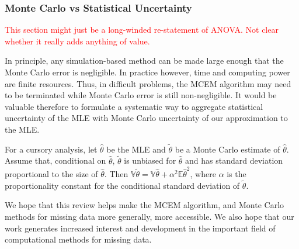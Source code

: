 \documentclass[11pt, oneside]{article}   	%
\newcommand{\bV}{\mathbb{V}}
\newcommand{\bE}{\mathbb{E}}
\begin{document}
\subsubsection{Monte Carlo vs Statistical Uncertainty}
\textcolor{red}{This section might just be a long-winded re-statement of ANOVA. Not clear whether it really adds anything of value.}

In principle, any simulation-based method can be made large enough that the Monte Carlo error is negligible. In practice however, time and computing power are finite resources. Thus, in difficult problems, the MCEM algorithm may need to be terminated while Monte Carlo error is still non-negligible. It would be valuable therefore to formulate a systematic way to aggregate statistical uncertainty of the MLE with Monte Carlo uncertainty of our approximation to the MLE. 

For a cursory analysis, let $\hat{\theta}$ be the MLE and $\tilde{\theta}$ be a Monte Carlo estimate of $\hat{\theta}$. Assume that, conditional on $\hat{\theta}$, $\tilde{\theta}$ is unbiased for $\hat{\theta}$ and has standard deviation proportional to the size of $\hat{\theta}$. Then $\bV \tilde{\theta} = \bV \hat{\theta} + \alpha^2 \bE \hat{\theta}^2$, where $\alpha$ is the proportionality constant for the conditional standard deviation of $\tilde{\theta}$. 


We hope that this review helps make the MCEM algorithm, and Monte Carlo methods for missing data more generally, more accessible. We also hope that our work generates increased interest and development in the important field of computational methods for missing data.



\newpage
\end{document}
